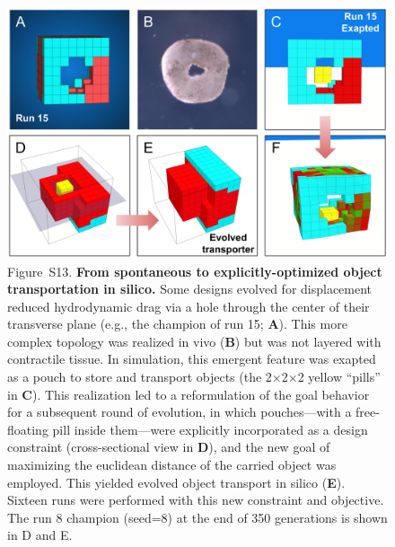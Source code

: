 \begin{figure}[t]
\centering
\includegraphics[width=\linewidth]{Chapter07/img/SupplementalDrugDelivery.png}
\caption*{Figure~S13.  \textbf{From spontaneous to explicitly-optimized object transportation in silico.} 
Some designs evolved for displacement reduced hydrodynamic drag via a hole through the center of their transverse plane (e.g., the champion of run 15; \textbf{A}). 
This more complex topology was realized in vivo (\textbf{B}) but was not layered with contractile tissue. 
In simulation, this emergent feature was exapted as a pouch to store and transport objects (the 2{$\times$}2{$\times$}2 yellow ``pills'' in \textbf{C}). 
This realization led to a reformulation of the goal behavior for a subsequent round of evolution, in which pouches---with a free-floating pill inside them---were explicitly incorporated as a design constraint (cross-sectional view in \textbf{D}), and the new goal of maximizing the euclidean distance of the carried object was employed. 
This yielded evolved object transport in silico (\textbf{E}). Sixteen runs were performed with this new constraint and objective. 
The run 8 champion (seed=8) at the end of 350 generations is shown in D and E. 
}
\end{figure}

